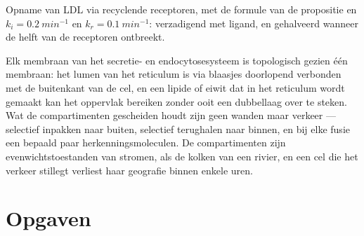 \begin{omfigure}

{\small Opname van LDL via recyclende receptoren, met de formule van de
propositie en $k_{i} = \qty{0.2}{min^{-1}}$ en $k_{r} =
\qty{0.1}{min^{-1}}$: verzadigend met ligand, en gehalveerd wanneer de
helft van de receptoren ontbreekt.}
\end{omfigure}

\begin{remark}\label{rem:b3:membrane-traffic:one-membrane}
Elk membraan van het secretie- en endocytosesysteem is topologisch
gezien één membraan: het lumen van het reticulum is via blaasjes
doorlopend verbonden met de buitenkant van de cel, en een lipide of
eiwit dat in het reticulum wordt gemaakt kan het oppervlak bereiken
zonder ooit een dubbellaag over te steken. Wat de compartimenten
gescheiden houdt zijn geen wanden maar verkeer --- selectief inpakken
naar buiten, selectief terughalen naar binnen, en bij elke fusie een
bepaald paar herkenningsmoleculen. De compartimenten zijn
evenwichtstoestanden van stromen, als de kolken van een rivier, en een
cel die het verkeer stillegt verliest haar geografie binnen enkele
uren.
\end{remark}

\section{Opgaven}

